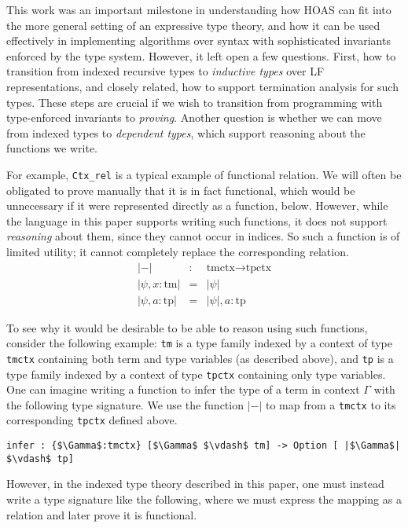 \documentclass{article}
\begin{document}
This work was an important milestone in understanding how HOAS can fit
into the more general setting of an expressive type theory, and how it
can be used effectively in implementing algorithms over syntax with
sophisticated invariants enforced by the type system. However, it left open a few
questions. First, how to transition from indexed recursive types to
\emph{inductive types} over LF representations, and closely related, how to support termination analysis for
such types. These steps are crucial if we wish to transition from
programming with type-enforced invariants to \emph{proving}. Another question is whether we can move
from indexed types to \emph{dependent types}, which support reasoning
about the functions we write.

For example, \lstinline{Ctx_rel} is a typical example of
functional relation. We will often be obligated to prove manually
that it is in fact functional, which would be unnecessary if it
were represented directly as a function, below. However, while the language in this paper supports writing such
functions, it does not support \emph{reasoning} about them, since they
cannot occur in indices. So such a function is of limited
utility; it cannot completely replace the corresponding relation.
\begin{eqnarray*}
|-| & : & \text{tmctx} \rightarrow \text{tpctx} \\
| \psi , x:\text{tm} | & = & | \psi | \\
| \psi , a:\text{tp} | & = & | \psi | , a:\text{tp}
\end{eqnarray*}

To see why it would be desirable to be able to reason using such
functions, consider the following example: \lstinline{tm} is a type family indexed by a context of type
\lstinline{tmctx} containing both term and type variables (as
described above), and \lstinline{tp} is a type family indexed by a
context of type \lstinline{tpctx} containing only type variables. One
can imagine writing a function to infer the type of a term in context
$\Gamma$ with the following type signature. We use the function $|-|$
to map from a \lstinline{tmctx} to its corresponding \lstinline{tpctx}
defined above.

\begin{lstlisting}
infer : {$\Gamma$:tmctx} [$\Gamma$ $\vdash$ tm] -> Option [ |$\Gamma$| $\vdash$ tp]
\end{lstlisting}

However, in the indexed type theory described in this paper, one must
instead write a type signature like the following, where we must
express the mapping as a relation and later prove it is functional.
\end{document}
